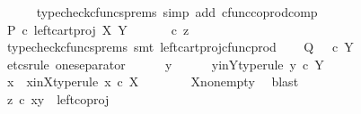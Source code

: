 \begin{isabellebody}
\ \ \ \ \isamarkupfalse%
\ {\isacharparenleft}{\kern0pt}typecheck{\isacharunderscore}{\kern0pt}cfuncs{\isacharunderscore}{\kern0pt}prems{\isacharcomma}{\kern0pt}\ simp\ add{\isacharcolon}{\kern0pt}\ cfunc{\isacharunderscore}{\kern0pt}coprod{\isacharunderscore}{\kern0pt}comp{\isacharparenright}{\kern0pt}\isanewline
\ \ \isamarkupfalse%
\ \isamarkupfalse%
\ {\isachardoublequoteopen}P\ {\isasymcirc}\isactrlsub c\ left{\isacharunderscore}{\kern0pt}cart{\isacharunderscore}{\kern0pt}proj\ X\ Y\ {\isacharequal}{\kern0pt}\ {\isacharparenleft}{\kern0pt}{\isasymt}\ {\isasymamalg}\ {\isasymf}\ {\isasymamalg}\ {\isasymf}{\isacharparenright}{\kern0pt}\ {\isasymcirc}\isactrlsub c\ z{\isachardoublequoteclose}\isanewline
\ \ \ \ \isamarkupfalse%
\ {\isacharparenleft}{\kern0pt}typecheck{\isacharunderscore}{\kern0pt}cfuncs{\isacharunderscore}{\kern0pt}prems{\isacharcomma}{\kern0pt}\ smt\ left{\isacharunderscore}{\kern0pt}cart{\isacharunderscore}{\kern0pt}proj{\isacharunderscore}{\kern0pt}cfunc{\isacharunderscore}{\kern0pt}prod{\isacharparenright}{\kern0pt}\isanewline
\isanewline
\ \ \isamarkupfalse%
\ {\isachardoublequoteopen}Q\ {\isacharequal}{\kern0pt}\ {\isasymt}\ {\isasymcirc}\isactrlsub c\ {\isasymbeta}\isactrlbsub Y\isactrlesub {\isachardoublequoteclose}\isanewline
\ \ \isamarkupfalse%
\ {\isacharparenleft}{\kern0pt}etcs{\isacharunderscore}{\kern0pt}rule\ one{\isacharunderscore}{\kern0pt}separator{\isacharparenright}{\kern0pt}\isanewline
\ \ \ \ \isamarkupfalse%
\ y\isanewline
\ \ \ \ \isamarkupfalse%
\ y{\isacharunderscore}{\kern0pt}in{\isacharunderscore}{\kern0pt}Y{\isacharbrackleft}{\kern0pt}type{\isacharunderscore}{\kern0pt}rule{\isacharbrackright}{\kern0pt}{\isacharcolon}{\kern0pt}\ {\isachardoublequoteopen}y\ {\isasymin}\isactrlsub c\ Y{\isachardoublequoteclose}\isanewline
\ \ \ \ \isamarkupfalse%
\ x\ \ x{\isacharunderscore}{\kern0pt}in{\isacharunderscore}{\kern0pt}X{\isacharbrackleft}{\kern0pt}type{\isacharunderscore}{\kern0pt}rule{\isacharbrackright}{\kern0pt}{\isacharcolon}{\kern0pt}\ {\isachardoublequoteopen}x\ {\isasymin}\isactrlsub c\ X{\isachardoublequoteclose}\isanewline
\ \ \ \ \ \ \isamarkupfalse%
\ X{\isacharunderscore}{\kern0pt}nonempty\ \isamarkupfalse%
\ blast\isanewline
\isanewline
\ \ \ \ \isamarkupfalse%
\ {\isachardoublequoteopen}z\ {\isasymcirc}\isactrlsub c\ {\isasymlangle}x{\isacharcomma}{\kern0pt}y{\isasymrangle}\ {\isacharequal}{\kern0pt}\ left{\isacharunderscore}{\kern0pt}coproj\ {\isasymone}\ {\isacharparenleft}{\kern0pt}{\isasymone}\ {\isasymCoprod}\ {\isasymone}{\isacharparenright}{\kern0pt}\isanewline

\end{isabellebody}
